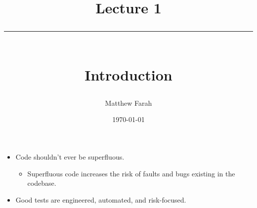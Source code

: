 \documentclass{article}
\date{
	\vspace{-.75em}
	{\large \today}
}
\title{
	\vspace*{-1.5em}
	{\Huge Lecture 1} \\
	\vspace{-1em}
	\rule{\textwidth/4}{.01em} \\
	\vspace{-.25em}
	{\Large Introduction}
	\vspace{-.75em}
}
\author{
	{\large Matthew Farah}
}
\begin{document}
\maketitle
\pagestyle{fancy}

\fi

\begin{itemize}
	\item Code shouldn't ever be superfluous.
	\begin{itemize}
		\item Superfluous code increases the risk of faults and bugs existing in the codebase.
	\end{itemize}
	\item Good tests are engineered, automated, and risk-focused.
\end{itemize}

\ifdefined\iscombined
	\newpage
\else
	
\end{document}

